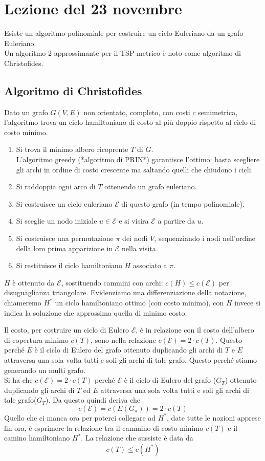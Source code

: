 \section{Lezione del 23 novembre}
Esiste un algoritmo polinomiale per costruire un ciclo Euleriano da un grafo Euleriano.\\
Un algoritmo 2-approssimante per il TSP metrico è noto come algoritmo di Christofides.

\subsection{Algoritmo di Christofides}
Dato un grafo $G(V,E)$ non orientato, completo, con costi $c$ semimetrica, l’algoritmo trova un ciclo hamiltoniano di costo al più doppio rispetto al ciclo di costo minimo.
\begin{enumerate}
    \item Si trova il minimo albero ricoprente $T$ di $G$.\\
    L’algoritmo greedy (*algoritmo di PRIN*) garantisce l’ottimo: basta scegliere gli archi in ordine di costo crescente ma saltando quelli che chiudono i cicli.
    \item Si raddoppia ogni arco di $T$ ottenendo un grafo euleriano.
    \item Si costruisce un ciclo euleriano $\mathcal{E}$ di questo grafo (in tempo polinomiale).
    \item Si sceglie un nodo iniziale $u \in \mathcal{E}$ e si visira $\mathcal{E}$ a partire da $u$.
    \item Si costruisce una permutazione $\pi$ dei nodi $V$, sequenziando i nodi nell’ordine della loro prima apparizione in $\mathcal{E}$ nella visita.
    \item Si restituisce il ciclo hamiltoniano $H$ associato a $\pi$. 
\end{enumerate}
$H$ è ottenuto da $\mathcal{E}$, sostituendo cammini con archi: $c(H) \leq c(\mathcal{E})$ per disuguaglianza triangolare.
Evidenziamo una differenziazione della notazione, chiameremo $H^*$ un ciclo hamiltoniano ottimo (con costo minimo), con $H$ invece si indica la soluzione che approssima quella di minimo costo.

Il costo, per costruire un ciclo di Eulero $\mathcal{E}$, è in relazione con il costo dell'albero di copertura minimo $c(T)$, sono nella relazione $c(\mathcal{E}) = 2 \cdot c(T)$. Questo perché $E$ è il ciclo di Eulero del grafo ottenuto duplicando gli archi di $T$ e $E$ attraversa una sola volta tutti e soli gli archi di tale grafo. Questo perché stiamo generando un multi grafo. \\
Si ha che $c(\mathcal{E}) = 2 \cdot c(T)$ perché $\mathcal{E}$ è il ciclo di Eulero del grafo ($G_T$) ottenuto duplicando gli archi di $T$ ed $E$ attraversa una sola volta tutti e soli gli archi di tale grafo($G_T$).  Da questo quindi deriva che \[c(\mathcal{E}) = c(E(G_{\pi})) = 2 \cdot c(T)\]
Quello che ci manca ora per poterci collegare ad $H^*$, date tutte le nozioni apprese fin ora, è esprimere la relazione tra il cammino di costo minimo $c(T)$ e il camino hamiltoniano $H^*$. La relazione che sussiste è data da \[c(T) \leq c(H^*)\]	

